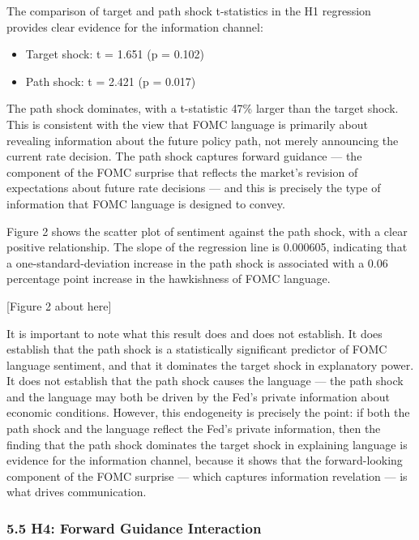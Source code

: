 \documentclass[12pt]{article}
\providecommand{\tightlist}{%
  \setlength{\itemsep}{0pt}\setlength{\parskip}{0pt}}
\begin{document}
The comparison of target and path shock t-statistics in the H1
regression provides clear evidence for the information channel:

\begin{itemize}
\tightlist
\item
  Target shock: \textbar t\textbar{} = 1.651 (p = 0.102)
\item
  Path shock: \textbar t\textbar{} = 2.421 (p = 0.017)
\end{itemize}

The path shock dominates, with a t-statistic 47\% larger than the target
shock. This is consistent with the view that FOMC language is primarily
about revealing information about the future policy path, not merely
announcing the current rate decision. The path shock captures forward
guidance --- the component of the FOMC surprise that reflects the
market's revision of expectations about future rate decisions --- and
this is precisely the type of information that FOMC language is designed
to convey.

Figure 2 shows the scatter plot of sentiment against the path shock,
with a clear positive relationship. The slope of the regression line is
0.000605, indicating that a one-standard-deviation increase in the path
shock is associated with a 0.06 percentage point increase in the
hawkishness of FOMC language.

{[}Figure 2 about here{]}

It is important to note what this result does and does not establish. It
does establish that the path shock is a statistically significant
predictor of FOMC language sentiment, and that it dominates the target
shock in explanatory power. It does not establish that the path shock
causes the language --- the path shock and the language may both be
driven by the Fed's private information about economic conditions.
However, this endogeneity is precisely the point: if both the path shock
and the language reflect the Fed's private information, then the finding
that the path shock dominates the target shock in explaining language is
evidence for the information channel, because it shows that the
forward-looking component of the FOMC surprise --- which captures
information revelation --- is what drives communication.

\subsubsection{5.5 H4: Forward Guidance
Interaction}\label{h4-forward-guidance-interaction}
\end{document}
